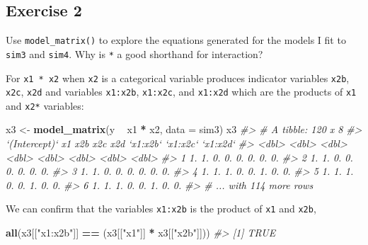 \documentclass[]{book}
\newenvironment{Shaded}{\begin{snugshade}}{\end{snugshade}}
\newcommand{\CommentTok}[1]{\textcolor[rgb]{0.56,0.35,0.01}{\textit{#1}}}
\newcommand{\DataTypeTok}[1]{\textcolor[rgb]{0.13,0.29,0.53}{#1}}
\newcommand{\KeywordTok}[1]{\textcolor[rgb]{0.13,0.29,0.53}{\textbf{#1}}}
\newcommand{\NormalTok}[1]{#1}
\newcommand{\OperatorTok}[1]{\textcolor[rgb]{0.81,0.36,0.00}{\textbf{#1}}}
\newcommand{\StringTok}[1]{\textcolor[rgb]{0.31,0.60,0.02}{#1}}
\theoremstyle{definition}
\theoremstyle{definition}
\theoremstyle{definition}
\theoremstyle{remark}
\begin{document}
\hypertarget{exercise-2-58}{%
\subsection{Exercise 2}\label{exercise-2-58}}

Use \texttt{model\_matrix()} to explore the equations generated for the
models I fit to \texttt{sim3} and \texttt{sim4}. Why is \texttt{*} a
good shorthand for interaction?

For \texttt{x1\ *\ x2} when \texttt{x2} is a categorical variable
produces indicator variables \texttt{x2b}, \texttt{x2c}, \texttt{x2d}
and variables \texttt{x1:x2b}, \texttt{x1:x2c}, and \texttt{x1:x2d}
which are the products of \texttt{x1} and \texttt{x2*} variables:

\begin{Shaded}
\begin{Highlighting}[]
\NormalTok{x3 <-}\StringTok{ }\KeywordTok{model_matrix}\NormalTok{(y }\OperatorTok{~}\StringTok{ }\NormalTok{x1 }\OperatorTok{*}\StringTok{ }\NormalTok{x2, }\DataTypeTok{data =}\NormalTok{ sim3)}
\NormalTok{x3}
\CommentTok{#> # A tibble: 120 x 8}
\CommentTok{#>   `(Intercept)`    x1   x2b   x2c   x2d `x1:x2b` `x1:x2c` `x1:x2d`}
\CommentTok{#>           <dbl> <dbl> <dbl> <dbl> <dbl>    <dbl>    <dbl>    <dbl>}
\CommentTok{#> 1            1.    1.    0.    0.    0.       0.       0.       0.}
\CommentTok{#> 2            1.    1.    0.    0.    0.       0.       0.       0.}
\CommentTok{#> 3            1.    1.    0.    0.    0.       0.       0.       0.}
\CommentTok{#> 4            1.    1.    1.    0.    0.       1.       0.       0.}
\CommentTok{#> 5            1.    1.    1.    0.    0.       1.       0.       0.}
\CommentTok{#> 6            1.    1.    1.    0.    0.       1.       0.       0.}
\CommentTok{#> # ... with 114 more rows}
\end{Highlighting}
\end{Shaded}

We can confirm that the variables \texttt{x1:x2b} is the product of
\texttt{x1} and \texttt{x2b},

\begin{Shaded}
\begin{Highlighting}[]
\KeywordTok{all}\NormalTok{(x3[[}\StringTok{"x1:x2b"}\NormalTok{]] }\OperatorTok{==}\StringTok{ }\NormalTok{(x3[[}\StringTok{"x1"}\NormalTok{]] }\OperatorTok{*}\StringTok{ }\NormalTok{x3[[}\StringTok{"x2b"}\NormalTok{]]))}
\CommentTok{#> [1] TRUE}
\end{Highlighting}
\end{Shaded}
\end{document}
